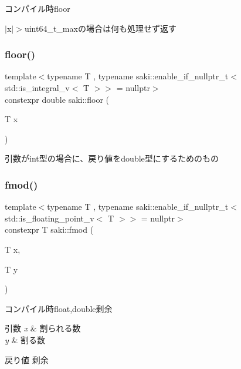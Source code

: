 コンパイル時floor 

$\vert$x$\vert$$>$uint64\+\_\+t\+\_\+maxの場合は何も処理せず返す \mbox{\label{namespacesaki_a327cd6800fef212948644f69cb31d4ff}} 
\subsubsection{\texorpdfstring{floor()}{floor()}\hspace{0.1cm}{\footnotesize\ttfamily [2/2]}}
{\footnotesize\ttfamily template$<$typename T , typename saki\+::enable\+\_\+if\+\_\+nullptr\+\_\+t$<$ std\+::is\+\_\+integral\+\_\+v$<$ T $>$$>$  = nullptr$>$ \\
constexpr double saki\+::floor (\begin{DoxyParamCaption}\item[{T}]{x }\end{DoxyParamCaption})}



引数がint型の場合に、戻り値をdouble型にするためのもの 

\mbox{\label{namespacesaki_a8a7b926b9d370e4a9aed84579675222c}} 
\subsubsection{\texorpdfstring{fmod()}{fmod()}\hspace{0.1cm}{\footnotesize\ttfamily [1/2]}}
{\footnotesize\ttfamily template$<$typename T , typename saki\+::enable\+\_\+if\+\_\+nullptr\+\_\+t$<$ std\+::is\+\_\+floating\+\_\+point\+\_\+v$<$ T $>$$>$  = nullptr$>$ \\
constexpr T saki\+::fmod (\begin{DoxyParamCaption}\item[{T}]{x,  }\item[{T}]{y }\end{DoxyParamCaption})}



コンパイル時float,double剰余 


\begin{DoxyParams}{引数}
{\em x} & 割られる数 \\
\hline
{\em y} & 割る数 \\
\hline
\end{DoxyParams}
\begin{DoxyReturn}{戻り値}
剰余 
\end{DoxyReturn}
\mbox{\label{namespacesaki_ac9d00b62957aebad23850e2f470a8d9c}} 
